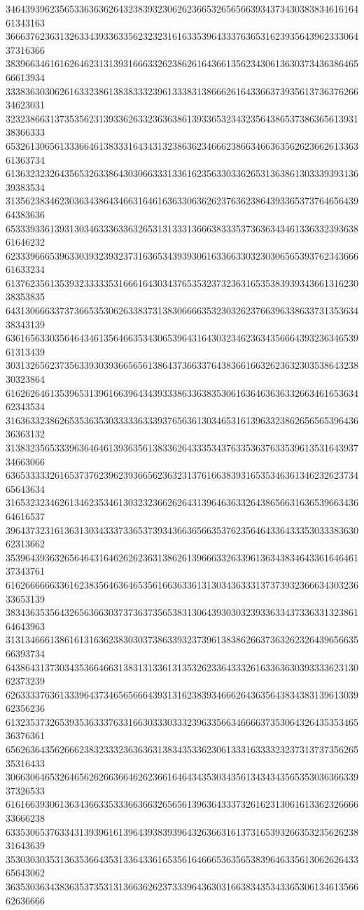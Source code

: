 34643939623565336363626432383932306262366532656566393437343038383461616461343163
36663762363132633439336335623232316163353964333763653162393564396233306437316366
38396634616162646231313931666332623862616436613562343061363037343638646566613934
33383630306261633238613838333239613338313866626164336637393561373637626634623031
32323866313735356231393362633236363861393365323432356438653738636561393138366333
65326130656133366461383331643431323863623466623866346636356262366261336361363734
61363232326435653263386430306633313361623563303362653136386130333939313639383534
31356238346230363438643466316461636330636262376362386439336537376465643964383636
65333933613931303463336336326531313331366638333537363634346133633239363861646232
62333966653963303932393237316365343939306163366330323030656539376234366661633234
61376235613539323333353166616430343765353237323631653538393934366131623038353835
64313066633737366535306263383731383066663532303262376639633863373135363438343139
63616563303564643461356466353430653964316430323462363435666439323634653961313439
30313265623735633930393665656138643736633764383661663262363230353864323830323864
61626264613539653139616639643439333863363835306163646363633266346165363462343534
31636332386265353635303333363339376563613034653161396332386265656539643636363132
31383235653339636464613936356138336264333534376335363763353961353164393734663066
63653333326165373762396239366562363231376166383931653534636134623262373465643634
31653232346261346235346130323236626264313964636332643865663163653966343664616537
39643732316136313034333733653739343663656635376235646433643335303338363062313662
35396439363265646431646262623631386261396663326339613634383464336164646137343761
61626666663361623835646364653561663633613130343633313737393236663430323633653139
38343635356432656366303737363735653831306439303032393363343733633132386164643963
31313466613861613163623830303738633932373961383862663736326232643965663566393734
64386431373034353664663138313133613135326233643332616336363039333362313062373239
62633337636133396437346565666439313162383934666264363564383438313961303962356236
61323537326539353633376331663033303332396335663466663735306432643535346536376361
65626364356266623832333236363631383435336230613331633332323731373735626535316433
30663064653264656262663664626236616464343530343561343434356535303636633937326533
61616639306136343663353336636632656561396364333732616231306161336232666633666238
63353065376334313939616139643938393964326366316137316539326635323562623831643639
35303030353136353664353133643361653561646665363565383964633561306262643365643062
36353036343836353735313136636262373339643630316638343534336530613461356662636666
